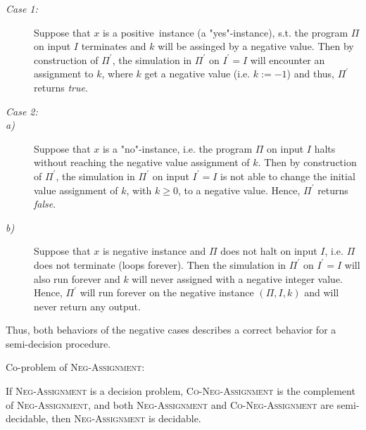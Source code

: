 \begin{description}
\item[\normalfont\slshape Case 1:] Suppose that $x$ is a positive\ instance
(a "yes"-instance), s.t. the program $\Pi $ on input $I$ terminates and $k$
will be assinged by a negative value. Then by construction of $\Pi ^{\prime
} $, the simulation in $\Pi ^{\prime }$ on $I^{\prime }=I$ will encounter an
assignment to $k$, where $k$ get a negative value (i.e. $k:=-1$) and thus, $%
\Pi ^{\prime }$ returns \textit{true}.

\item[\normalfont\slshape Case 2:] 

\item[\textit{a)}] Suppose that $x$ is a "no"-instance, i.e. the program $\Pi $ on
input $I$ halts without reaching the negative value assignment of $k$. Then
by construction of $\Pi ^{\prime }$, the simulation in $\Pi ^{\prime }$ on
input $I^{\prime }=I$ is not able to change the initial value assignment of $%
k$, with $k\geq 0$, to a negative value. Hence, $\Pi ^{\prime }$ returns 
\textit{false}.

\item[\textit{b)}] Suppose that $x$ is negative instance and $\Pi $ does not halt on
input $I$, i.e. $\Pi $ does not terminate (loops forever). Then the
simulation in $\Pi ^{\prime }$ on $I^{\prime }=I$ will also run forever and $%
k$ will never assigned with a negative integer value. Hence, $\Pi ^{\prime }$
will run forever on the negative instance $(\Pi ,I,k)$ and will never return
any output.
\end{description}

Thus, both behaviors of the negative cases describes a correct behavior for
a semi-decision procedure.

\bigskip 

\noindent Co-problem of \textsc{Neg-Assignment}:

\medskip

\noindent If \textsc{Neg-Assignment} is a decision problem, \textsc{Co-Neg-Assignment} 
is the complement of \textsc{Neg-Assignment}, and both \textsc{Neg-Assignment} 
and \textsc{Co-Neg-Assignment} are semi-decidable, then \textsc{Neg-Assignment} 
is decidable.


\bigskip 

